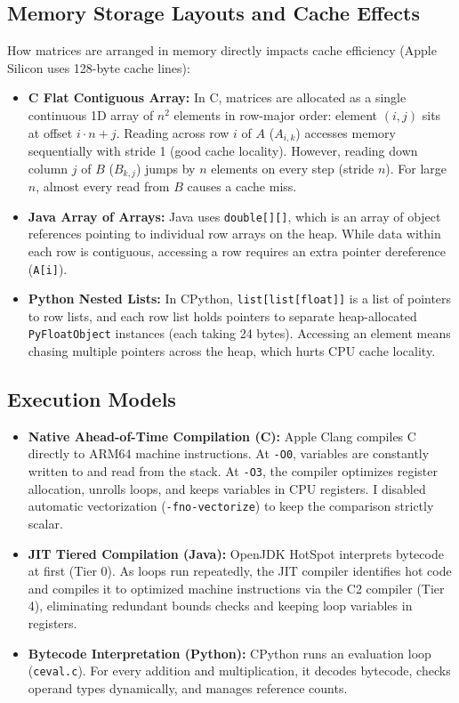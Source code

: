 \documentclass[10pt,conference,a4paper]{IEEEtran}
\begin{document}
\subsection{Memory Storage Layouts and Cache Effects}
How matrices are arranged in memory directly impacts cache efficiency (Apple Silicon uses 128-byte cache lines):
\begin{itemize}
    \item \textbf{C Flat Contiguous Array:} In C, matrices are allocated as a single continuous 1D array of $n^2$ elements in row-major order: element $(i, j)$ sits at offset $i \cdot n + j$. Reading across row $i$ of $A$ ($A_{i,k}$) accesses memory sequentially with stride 1 (good cache locality). However, reading down column $j$ of $B$ ($B_{k,j}$) jumps by $n$ elements on every step (stride $n$). For large $n$, almost every read from $B$ causes a cache miss.
    \item \textbf{Java Array of Arrays:} Java uses \texttt{double[][]}, which is an array of object references pointing to individual row arrays on the heap. While data within each row is contiguous, accessing a row requires an extra pointer dereference (\texttt{A[i]}).
    \item \textbf{Python Nested Lists:} In CPython, \texttt{list[list[float]]} is a list of pointers to row lists, and each row list holds pointers to separate heap-allocated \texttt{PyFloatObject} instances (each taking 24 bytes). Accessing an element means chasing multiple pointers across the heap, which hurts CPU cache locality.
\end{itemize}

\subsection{Execution Models}
\begin{itemize}
    \item \textbf{Native Ahead-of-Time Compilation (C):} Apple Clang compiles C directly to ARM64 machine instructions. At \texttt{-O0}, variables are constantly written to and read from the stack. At \texttt{-O3}, the compiler optimizes register allocation, unrolls loops, and keeps variables in CPU registers. I disabled automatic vectorization (\texttt{-fno-vectorize}) to keep the comparison strictly scalar.
    \item \textbf{JIT Tiered Compilation (Java):} OpenJDK HotSpot interprets bytecode at first (Tier 0). As loops run repeatedly, the JIT compiler identifies hot code and compiles it to optimized machine instructions via the C2 compiler (Tier 4), eliminating redundant bounds checks and keeping loop variables in registers.
    \item \textbf{Bytecode Interpretation (Python):} CPython runs an evaluation loop (\texttt{ceval.c}). For every addition and multiplication, it decodes bytecode, checks operand types dynamically, and manages reference counts.
\end{itemize}
\end{document}
